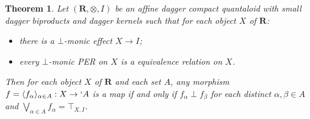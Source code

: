 \documentclass[12pt]{tac}
\newtheorem{theorem}{Theorem}[section]
\theoremstyle{definition}
\theoremstyle{remark}
\newcommand{\<}{\langle}
\renewcommand{\>}{\rangle}
\renewcommand{\:}{\colon}
\begin{document}
\begin{theorem}\label{thm:functions with classical codomain}
    Let $(\mathbf R,\otimes,I)$ be an affine dagger compact quantaloid with small dagger biproducts and dagger kernels such that for each object $X$ of $\mathbf R$:
    \begin{itemize}
        \item[(1)] there is a $\bot$-monic effect $X\to I$;
        \item[(2)] every $\bot$-monic PER on $X$ is a equivalence relation on $X$.
        \end{itemize}
        Then for each object $X$ of $\mathbf R$ and each set $A$, any morphism $f=\langle f_\alpha\rangle_{\alpha\in A}:X\to `A$ is a map if and only if $f_\alpha\perp f_\beta$ for each distinct $\alpha,\beta\in A$ and $\bigvee_{\alpha\in A}f_\alpha=\top_{X,I}$.
\end{theorem}
\end{document}
